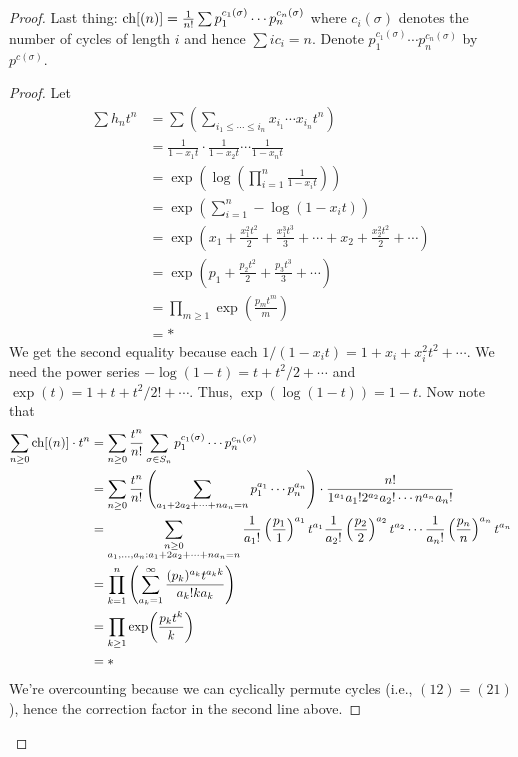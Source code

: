 \documentclass[../notes.tex]{subfiles}
\begin{document}
\begin{itemize}
\begin{proof}
        Last thing: $\operatorname{ch}[(n)]=\frac{1}{n!}\sum p_1^{c_1(\sigma)}\cdots p_n^{c_n(\sigma)}$ where $c_i(\sigma)$ denotes the number of cycles of length $i$ and hence $\sum ic_i=n$. Denote $p_1^{c_1(\sigma)}\cdots p_n^{c_n(\sigma)}$ by $p^{c(\sigma)}$.
        \begin{proof}
            Let
            \begin{align*}
                \sum h_n t^n &= \sum(\sum_{i_1\leq\cdots\leq i_n}x_{i_1}\cdots x_{i_n}t^n)\\
                &= \frac{1}{1-x_1t}\cdot\frac{1}{1-x_2t}\cdots\frac{1}{1-x_nt}\\
                &= \exp(\log(\prod_{i=1}^n\frac{1}{1-x_it}))\\
                &= \exp(\sum_{i=1}^n-\log(1-x_it))\\
                &= \exp(x_1+\frac{x_1^2t^2}{2}+\frac{x_1^3t^3}{3}+\cdots+x_2+\frac{x_2^2t^2}{2}+\cdots)\\
                &= \exp(p_1+\frac{p_2t^2}{2}+\frac{p_3t^3}{3}+\cdots)\\
                &= \prod_{m\geq 1}\exp(\frac{p_mt^m}{m})\\
                &= *
            \end{align*}
            We get the second equality because each $1/(1-x_it)=1+x_i+x_i^2t^2+\cdots$.
            We need the power series $-\log(1-t)=t+t^2/2+\cdots$ and $\exp(t)=1+t+t^2/2!+\cdots$. Thus, $\exp(\log(1-t))=1-t$.
            Now note that
            \begin{align*}
                \sum_{n\geq 0}\operatorname{ch}[(n)]\cdot t^n &= \sum_{n\geq 0}\frac{t^n}{n!}\sum_{\sigma\in S_n}p_1^{c_1(\sigma)}\cdots p_n^{c_n(\sigma)}\\
                &= \sum_{n\geq 0}\frac{t^n}{n!}\left( \sum_{a_1+2a_2+\cdots+na_n=n}p_1^{a_1}\cdots p_n^{a_n} \right)\cdot\frac{n!}{1^{a_1}a_1!2^{a_2}a_2!\cdots n^{a_n}a_n!}\\
                &= \sum_{\substack{n\geq 0\\a_1,\dots,a_n:a_1+2a_2+\cdots+na_n=n}}\frac{1}{a_1!}\left( \frac{p_1}{1} \right)^{a_1}t^{a_1}\frac{1}{a_2!}\left( \frac{p_2}{2} \right)^{a_2}t^{a_2}\cdots\frac{1}{a_n!}\left( \frac{p_n}{n} \right)^{a_n}t^{a_n}\\
                &= \prod_{k=1}^n\left( \sum_{a_k=1}^\infty\frac{(p_k)^{a_k}t^{a_kk}}{a_k!ka_k} \right)\\
                &= \prod_{k\geq 1}\exp(\frac{p_kt^k}{k})\\
                &= *
            \end{align*}
            We're overcounting because we can cyclically permute cycles (i.e., $(12)=(21)$), hence the correction factor in the second line above.


\end{proof}
\end{proof}
\end{itemize}
\end{document}
